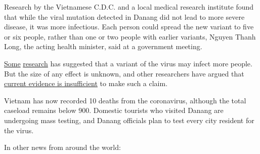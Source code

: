 Research by the Vietnamese C.D.C. and a local medical research institute
found that while the viral mutation detected in Danang did not lead to
more severe disease, it was more infectious. Each person could spread
the new variant to five or six people, rather than one or two people
with earlier variants, Nguyen Thanh Long, the acting health minister,
said at a government meeting.

\href{https://www.nytimes3xbfgragh.onion/2020/06/12/science/coronavirus-mutation-genetics-spike.html}{Some}
\href{https://www.medrxiv.org/content/10.1101/2020.07.31.20166082v1}{research}
has suggested that a variant of the virus may infect more people. But
the size of any effect is unknown, and other researchers have argued
that
\href{https://www.cell.com/cell/pdf/S0092-8674(20)30817-5.pdf}{current
evidence is insufficient} to make such a claim.

Vietnam has now recorded 10 deaths from the coronavirus, although the
total caseload remains below 900. Domestic tourists who visited Danang
are undergoing mass testing, and Danang officials plan to test every
city resident for the virus.

In other news from around the world:


